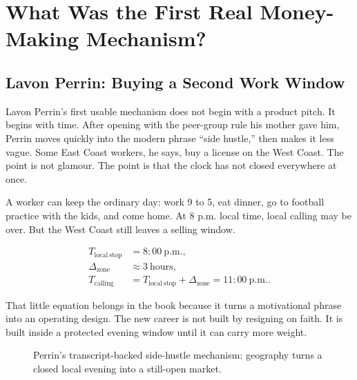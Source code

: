 \documentclass[11pt,oneside]{book}
\begin{document}
\chapter{What Was the First Real Money-Making Mechanism?}

\section{Lavon Perrin: Buying a Second Work Window}

Lavon Perrin's first usable mechanism does not begin with a product pitch. It begins with time. After opening with the peer-group rule his mother gave him, Perrin moves quickly into the modern phrase ``side hustle,'' then makes it less vague. Some East Coast workers, he says, buy a license on the West Coast. The point is not glamour. The point is that the clock has not closed everywhere at once.

A worker can keep the ordinary day: work 9 to 5, eat dinner, go to football practice with the kids, and come home. At 8 p.m. local time, local calling may be over. But the West Coast still leaves a selling window.

\begin{align}
T_{\mathrm{local\ stop}} &= 8{:}00\ \mathrm{p.m.},\\
\Delta_{\mathrm{zone}} &\approx 3\ \mathrm{hours},\\
T_{\mathrm{calling}} &= T_{\mathrm{local\ stop}}+\Delta_{\mathrm{zone}}
=11{:}00\ \mathrm{p.m.}.
\end{align}

That little equation belongs in the book because it turns a motivational phrase into an operating design. The new career is not built by resigning on faith. It is built inside a protected evening window until it can carry more weight.

\begin{figure}
\centering
{}
\caption{Perrin's transcript-backed side-hustle mechanism: geography turns a closed local evening into a still-open market.}
\end{figure}
\end{document}
